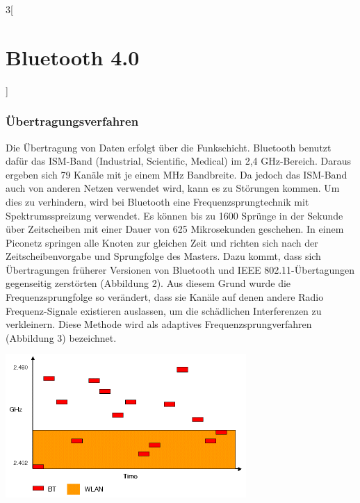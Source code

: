 \begin{multicols}{3}[\section{Bluetooth 4.0}]
\subsubsection*{Übertragungsverfahren}
Die Übertragung von Daten erfolgt über die Funkschicht. Bluetooth benutzt dafür das ISM-Band (Industrial, Scientific, Medical) im 2,4 GHz-Bereich. Daraus ergeben sich 79 Kanäle mit je einem MHz Bandbreite. Da jedoch das ISM-Band auch von anderen Netzen verwendet wird, kann es zu Störungen kommen. Um dies zu verhindern, wird bei Bluetooth eine Frequenzsprungtechnik mit Spektrumsspreizung verwendet. Es können bis zu 1600 Sprünge in der Sekunde über Zeitscheiben mit einer Dauer von 625 Mikrosekunden geschehen. In einem Piconetz springen alle Knoten zur gleichen Zeit und richten sich nach der Zeitscheibenvorgabe und Sprungfolge des Masters. Dazu kommt, dass sich Übertragungen früherer Versionen von Bluetooth und IEEE 802.11-Übertagungen gegenseitig zerstörten (Abbildung 2). Aus diesem Grund wurde die Frequenzsprungfolge so verändert, dass sie Kanäle auf denen andere Radio Frequenz-Signale existieren auslassen, um die schädlichen Interferenzen zu verkleinern. Diese Methode wird als adaptives Frequenzsprungverfahren (Abbildung 3) bezeichnet.\cite{Bluetooth_4.2}

\begin{Figure}
\includegraphics[width=\linewidth]{Kapitel/Bluetooth_4/Grafiken/kollisionen.png}
\label{fig:vorlage.vorlesungssaal}
\end{Figure}


\end{multicols}
